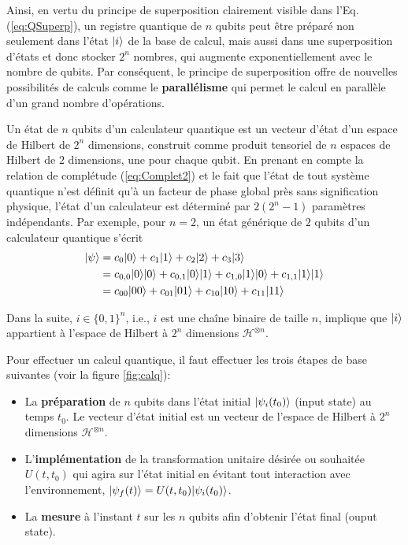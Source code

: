 Ainsi, en vertu du principe de superposition clairement visible dans l'Eq.
(\ref{eq:QSuperp}), un registre quantique de $n$ qubits peut être préparé non
seulement dans l'état $\vert i\rangle $ de la base de calcul, mais
aussi dans une superposition d'états et donc stocker $2^n$ nombres, qui
augmente exponentiellement avec le nombre de qubits. Par conséquent, le
principe de superposition offre de nouvelles possibilités de calculs comme le
\textbf{parallélisme} qui permet le calcul en parallèle d'un grand nombre
d'opérations.

Un état de $n$ qubits d'un calculateur quantique est un vecteur d'état d'un
espace de Hilbert de $2^n$ dimensions, construit comme produit tensoriel de
$n$ espaces de Hilbert de $2$ dimensions, une pour chaque qubit. En prenant en
compte la relation de complétude (\ref{eq:Complet2}) et le fait que l'état de
tout système quantique n'est définit qu'à un facteur de phase global près sans
signification physique, l'état d'un calculateur est déterminé par $2(2^n-1)$
paramètres indépendants. Par exemple, pour $n=2$, un état générique de $2$
qubits d'un calculateur quantique s'écrit%
\begin{equation}
\begin{split}
\vert\psi\rangle &  =c_0\vert0\rangle+c_1\vert1\rangle +c_2\vert2\rangle +c_{3}\vert3\rangle \\
&  =c_{0,0}\vert0\rangle \vert0\rangle +c_{0,1}\vert0\rangle \vert1\rangle +c_{1,0}\vert1\rangle \vert0\rangle
+c_{1,1}\vert1\rangle\vert1\rangle \\
&  =c_{00}\vert00\rangle +c_{01}\vert01\rangle+c_{10}\vert10\rangle +c_{11}\vert11\rangle
\end{split}
\end{equation}

Dans la suite, $i\in\{0,1\}^n$, i.e., $i$ est une chaîne binaire de taille
$n$, implique que $\vert i\rangle $ appartient à l'espace de Hilbert à $2^n$
dimensions $\mathcal{H}^{\otimes n}$.

Pour effectuer un calcul quantique, il faut effectuer les trois étapes de base
suivantes (voir la figure \ref{fig:calq}):

\begin{itemize}
\item La \textbf{préparation} de $n$ qubits dans l'état initial
$\vert\psi_{i}(t_0)\rangle$ (input state) au temps $t_0$. Le vecteur d'état
initial est un vecteur de l'espace de Hilbert à $2^n$ dimensions
$\mathcal{H}^{\otimes n}$.

\item L'\textbf{implémentation} de la transformation unitaire désirée ou
souhaitée $U(t,t_0)$ qui agira sur l'état initial en évitant tout interaction
avec l'environnement, $\vert\psi_{f}(t)\rangle =U(t,t_0)\vert\psi_{i}(t_0)\rangle $.

\item La \textbf{mesure} à l'instant $t$ sur les $n$ qubits afin d'obtenir
l'état final (ouput state).
\end{itemize}

